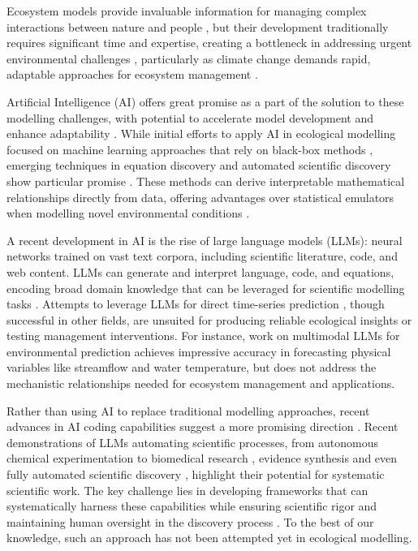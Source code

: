 Ecosystem models provide invaluable information for managing complex interactions between nature and people \citep{McCarthy2004, Holden2016}, but their development traditionally requires significant time and expertise, creating a bottleneck in addressing urgent environmental challenges \citep{Dichmont2017,Holden2024b}, particularly as climate change demands rapid, adaptable approaches for ecosystem management \citep{weiskopf2020climate,malhi2020climate}.

Artificial Intelligence (AI) offers great promise as a part of the solution to these modelling challenges, with potential to accelerate model development and enhance adaptability \citep{Spillias2024}. While initial efforts to apply AI in ecological modelling focused on machine learning approaches that rely on black-box methods \citep{morales2024developing}, emerging techniques in equation discovery and automated scientific discovery show particular promise \citep{Huntingford_Nicoll_Klein_Ahmad_2024,floryan2022data}. These methods can derive interpretable mathematical relationships directly from data, offering advantages over statistical emulators when modelling novel environmental conditions \citep{Schaeffer_2017,chen2024constructing,karniadakis2021physics}. 

A recent development in AI is the rise of large language models (LLMs): neural networks trained on vast text corpora, including scientific literature, code, and web content. LLMs can generate and interpret language, code, and equations, encoding broad domain knowledge that can be leveraged for scientific modelling tasks \citep{mammides2024role,wills2024use}. Attempts to leverage LLMs for direct time-series prediction \citep{zhang2024large,su2024large,hassani2024predictions,gandhi2024generative,bylund2024chatgpt,cao2023tempo,li2024lite,garza2023timegpt}, though successful in other fields, are unsuited for producing reliable ecological insights or testing management interventions. For instance, work on multimodal LLMs for environmental prediction \citep{li2024lite} achieves impressive accuracy in forecasting physical variables like streamflow and water temperature, but does not address the mechanistic relationships needed for ecosystem management and applications.

Rather than using AI to replace traditional modelling approaches, recent advances in AI coding capabilities suggest a more promising direction \citep{Xu2021}. Recent demonstrations of LLMs automating scientific processes, from autonomous chemical experimentation \citep{burger2023autonomous} to biomedical research \citep{wang2024bioresearcher}, evidence synthesis \citep{spillias2024evaluating} and even fully automated scientific discovery \citep{kramer2023automated}, highlight their potential for systematic scientific work. The key challenge lies in developing frameworks that can systematically harness these capabilities while ensuring scientific rigor and maintaining human oversight in the discovery process \citep{kramer2023automated,Spillias2024}. To the best of our knowledge, such an approach has not been attempted yet in ecological modelling.


